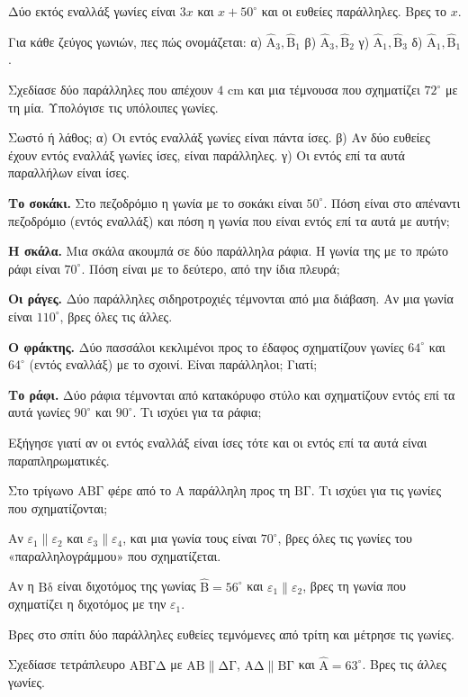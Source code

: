 \ex Δύο εκτός εναλλάξ γωνίες είναι $3x$ και $x+50^\circ$ και οι ευθείες παράλληλες. Βρες το $x$.

\ex Για κάθε ζεύγος γωνιών, πες πώς ονομάζεται: α) $\hat{\mathrm{Α}}_3,\hat{\mathrm{Β}}_1$ β) $\hat{\mathrm{Α}}_3,\hat{\mathrm{Β}}_2$ γ) $\hat{\mathrm{Α}}_1,\hat{\mathrm{Β}}_3$ δ) $\hat{\mathrm{Α}}_1,\hat{\mathrm{Β}}_1$.

\ex Σχεδίασε δύο παράλληλες που απέχουν $4$ cm και μια τέμνουσα που σχηματίζει $72^\circ$ με τη μία. Υπολόγισε τις υπόλοιπες γωνίες.

\ex Σωστό ή λάθος; α) Οι εντός εναλλάξ γωνίες είναι πάντα ίσες. \quad β) Αν δύο ευθείες έχουν εντός εναλλάξ γωνίες ίσες, είναι παράλληλες. \quad γ) Οι εντός επί τα αυτά παραλλήλων είναι ίσες.


\ex \textbf{Το σοκάκι.} Στο πεζοδρόμιο η γωνία με το σοκάκι είναι $50^\circ$. Πόση είναι στο απέναντι πεζοδρόμιο (εντός εναλλάξ) και πόση η γωνία που είναι εντός επί τα αυτά με αυτήν;

\ex \textbf{Η σκάλα.} Μια σκάλα ακουμπά σε δύο παράλληλα ράφια. Η γωνία της με το πρώτο ράφι είναι $70^\circ$. Πόση είναι με το δεύτερο, από την ίδια πλευρά;

\ex \textbf{Οι ράγες.} Δύο παράλληλες σιδηροτροχιές τέμνονται από μια διάβαση. Αν μια γωνία είναι $110^\circ$, βρες όλες τις άλλες.

\ex \textbf{Ο φράκτης.} Δύο πασσάλοι κεκλιμένοι προς το έδαφος σχηματίζουν γωνίες $64^\circ$ και $64^\circ$ (εντός εναλλάξ) με το σχοινί. Είναι παράλληλοι; Γιατί;

\ex \textbf{Το ράφι.} Δύο ράφια τέμνονται από κατακόρυφο στύλο και σχηματίζουν εντός επί τα αυτά γωνίες $90^\circ$ και $90^\circ$. Τι ισχύει για τα ράφια;


\ex Εξήγησε γιατί αν οι εντός εναλλάξ είναι ίσες τότε και οι εντός επί τα αυτά είναι παραπληρωματικές.

\ex Στο τρίγωνο $\mathrm{ΑΒΓ}$ φέρε από το $\mathrm{Α}$ παράλληλη προς τη $\mathrm{ΒΓ}$. Τι ισχύει για τις γωνίες που σχηματίζονται;

\ex Αν $\varepsilon_1\parallel\varepsilon_2$ και $\varepsilon_3\parallel\varepsilon_4$, και μια γωνία τους είναι $70^\circ$, βρες όλες τις γωνίες του «παραλληλογράμμου» που σχηματίζεται.

\ex Αν η $\mathrm{Βδ}$ είναι διχοτόμος της γωνίας $\hat{\mathrm{Β}}=56^\circ$ και $\varepsilon_1\parallel\varepsilon_2$, βρες τη γωνία που σχηματίζει η διχοτόμος με την $\varepsilon_1$.


\ex Βρες στο σπίτι δύο παράλληλες ευθείες τεμνόμενες από τρίτη και μέτρησε τις γωνίες.

\ex Σχεδίασε τετράπλευρο $\mathrm{ΑΒΓΔ}$ με $\mathrm{ΑΒ}\parallel\mathrm{ΔΓ}$, $\mathrm{ΑΔ}\parallel\mathrm{ΒΓ}$ και $\hat{\mathrm{Α}}=63^\circ$. Βρες τις άλλες γωνίες.
